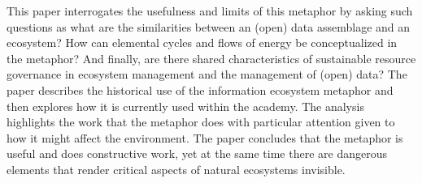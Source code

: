 This paper interrogates the usefulness and limits of this metaphor by asking such questions as what are the similarities between an (open) data assemblage and an ecosystem? How can elemental cycles and flows of energy be conceptualized in the metaphor? And finally, are there shared characteristics of sustainable resource governance in ecosystem management and the management of (open) data?  The paper describes the historical use of the information ecosystem metaphor and then explores how it is currently used within the academy. The analysis highlights the work that the metaphor does with particular attention given to how it might affect the environment. The paper concludes that the metaphor is useful and does constructive work, yet at the same time there are dangerous elements that render critical aspects of natural ecosystems invisible.
